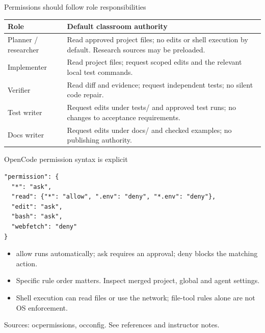 \documentclass[aspectratio=169,11pt]{beamer}
\begin{document}
\begin{frame}[t,fragile]{Permissions should follow role responsibilities}
\fontsize{10.5}{12.5}\selectfont\setlength{\tabcolsep}{4pt}\renewcommand{\arraystretch}{1.15}
\begin{tabular}{>{\raggedright\arraybackslash}p{}>{\raggedright\arraybackslash}p{}}
\toprule
\textbf{Role} & \textbf{Default classroom authority} \\ \midrule
Planner / researcher & Read approved project files; no edits or shell execution by default. Research sources may be preloaded. \\[2pt]
Implementer & Read project files; request scoped edits and the relevant local test commands. \\[2pt]
Verifier & Read diff and evidence; request independent tests; no silent code repair. \\[2pt]
Test writer & Request edits under tests/ and approved test runs; no changes to acceptance requirements. \\[2pt]
Docs writer & Request edits under docs/ and checked examples; no publishing authority. \\[2pt]
\bottomrule\end{tabular}\par\vspace{2mm}
\end{frame}
\begin{frame}[t,fragile]{OpenCode permission syntax is explicit}
\begin{lstlisting}
"permission": {
  "*": "ask",
  "read": {"*": "allow", ".env": "deny", "*.env": "deny"},
  "edit": "ask",
  "bash": "ask",
  "webfetch": "deny"
}
\end{lstlisting}
\fontsize{10.5}{12.5}\selectfont
\begin{itemize}\setlength{\itemsep}{2mm}
\item allow runs automatically; ask requires an approval; deny blocks the matching action.
\item Specific rule order matters. Inspect merged project, global and agent settings.
\item Shell execution can read files or use the network; file-tool rules alone are not OS enforcement.
\end{itemize}
\vfill{\fontsize{6.5}{8}\selectfont\color{UTgray} Sources: ocpermissions, occonfig. See references and instructor notes.\par}
\end{frame}
\end{document}
